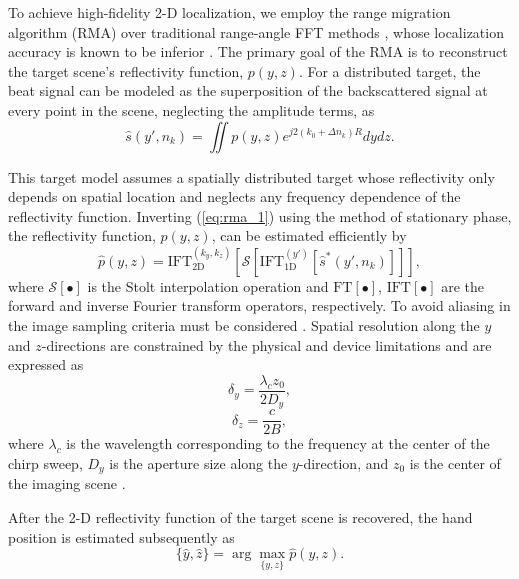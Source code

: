 \documentclass[10pt,journal,final]{IEEEtran}
\begin{document}
To achieve high-fidelity 2-D localization, we employ the range migration algorithm (RMA) over traditional range-angle FFT methods \cite{ti:intro_to_FMCW_radars, kim2020aziumth}, whose localization accuracy is known to be inferior \cite{mimo:joint_range_angle_estimation}. 
The primary goal of the RMA is to reconstruct the target scene's reflectivity function, $p(y,z)$.
For a distributed target, the beat signal can be modeled as the superposition of the backscattered signal at every point in the scene, neglecting the amplitude terms, as
\begin{equation}
	\label{eq:rma_1}
	\hat{s}(y',n_k) = \iint p(y,z) e^{j2(k_0 + \Delta n_k)R}dydz.
\end{equation}

This target model assumes a spatially distributed target whose reflectivity only depends on spatial location and neglects any frequency dependence of the reflectivity function. 
Inverting (\ref{eq:rma_1}) using the method of stationary phase, the reflectivity function, $p(y,z)$, can be estimated efficiently by
\begin{equation}
	\label{eq:rma_summary}
	\hat{p}(y,z) = \text{IFT}_{\text{2D}}^{(k_y,k_z)}\left[ \mathcal{S}\left[ \text{IFT}_{\text{1D}}^{(y')}[\hat{s}^*(y',n_k)] \right] \right],
\end{equation}
where $\mathcal{S}[\bullet]$ is the Stolt interpolation operation \cite{muhammet:testbeds} and $\text{FT}[\bullet]$, $\text{IFT}[\bullet]$ are the forward and inverse Fourier transform operators, respectively. 
To avoid aliasing in the image sampling criteria must be considered \cite{muhammet:sparse}. Spatial resolution along the $y$ and $z$-directions are constrained by the physical and device limitations and are expressed as 
\begin{equation}
    \label{eq:y_res}
    \delta_y = \frac{\lambda_c z_0}{2 D_y},
\end{equation}
\begin{equation}
    \label{eq:z_res}
    \delta_z = \frac{c}{2 B},
\end{equation}
where $\lambda_c$ is the wavelength corresponding to the frequency at the center of the chirp sweep, $D_y$ is the aperture size along the $y$-direction, and $z_0$ is the center of the imaging scene \cite{muhammet:sparse}.


After the 2-D reflectivity function of the target scene is recovered, the hand position is estimated subsequently as
\begin{equation}
\label{eq:location_estimate}
    \{\hat{y},\hat{z}\} = \arg \max_{\{y,z\}} \hat{p}(y,z).
\end{equation}
\end{document}

